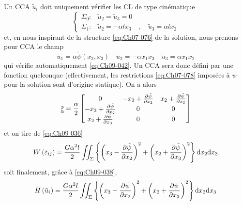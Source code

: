 Un CCA $\tilde{u}_i$ doit uniquement vérifier les CL de type cinématique 
\begin{equation}
    \left\{
    \begin{aligned}
        \Sigma_0: & \tilde{u}_2 = \tilde{u}_3 = 0 \\
        \Sigma_1: & \tilde{u}_2 = -\alpha l x_3 \quad, \quad \tilde{u}_3 = \alpha l x_2
    \end{aligned}
    \right.
    \label{eq:Ch09-042}
\end{equation}
et, en nous inspirant de la structure \eqref{eq:Ch07-076} de la solution, nous prenons pour CCA le champ 
\begin{equation}
    \tilde{u}_1 = \alpha \tilde{\psi} (x_2, x_3) \quad \tilde{u}_2 = -\alpha x_1 x_3 \quad \tilde{u}_3 = \alpha x_1 x_2
    \label{eq:Ch09-043}
\end{equation}
qui vérifie automatiquement \eqref{eq:Ch09-042}.
Un CCA sera donc défini par une fonction quelconque (effectivement, les restrictions \eqref{eq:Ch07-078} imposées à $\psi$ pour la solution sont d'origine statique).
On a alors
\begin{equation}
    \tilde{\underline{\underline{\varepsilon}}} = \frac{\alpha}{2}
    \begin{bmatrix}
        0 & -x_3 + \frac{\partial \tilde{\psi}}{\partial x_2} & x_2 + \frac{\partial \tilde{\psi}}{\partial x_3} \\
        -x_3 + \frac{\partial \tilde{\psi}}{\partial x_2} & 0 & 0 \\
        x_2 + \frac{\partial \tilde{\psi}}{\partial x_3} & 0 & 0
    \end{bmatrix}
    \label{eq:Ch09-044}
\end{equation}
et on tire de \eqref{eq:Ch09-036} 
\begin{equation}
    W \left( \tilde{\varepsilon}_{ij} \right) = \frac{G\alpha^2 l}{2} \iint_{\Sigma} \left\{ \left( x_3 - \frac{\partial \tilde{\psi}}{\partial x_2} \right)^2 + \left( x_2 + \frac{\partial \tilde{\psi}}{\partial x_3} \right)^2 \right\}\mathrm{d} x_2 \mathrm{d} x_3
    \label{eq:Ch09-045}
\end{equation}
soit finalement, grâce à \eqref{eq:Ch09-038}, 
\begin{equation}
    H \left( \tilde{u}_{i} \right) = \frac{G\alpha^2 l}{2} \iint_{\Sigma} \left\{ \left( x_3 - \frac{\partial \tilde{\psi}}{\partial x_2} \right)^2 + \left( x_2 + \frac{\partial \tilde{\psi}}{\partial x_3} \right)^2 \right\}\mathrm{d} x_2 \mathrm{d} x_3
    \label{eq:Ch09-046}
\end{equation}

